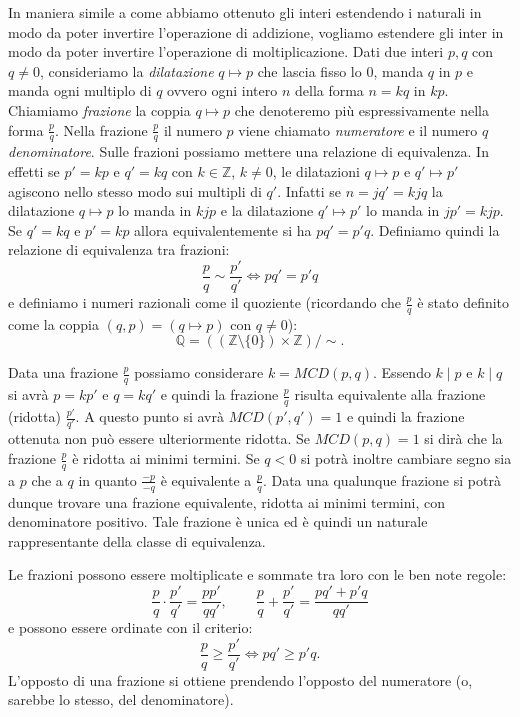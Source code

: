 \documentclass[italian,a4paper,hidelinks,headinclude]{scrartcl}
\newcommand{\ZZ}{{\mathbb Z}}
\newcommand{\QQ}{{\mathbb Q}}
\newcommand{\myemph}[1]{\emph{#1}\marginpar{#1}}
\begin{document}
In maniera simile a come abbiamo ottenuto gli interi estendendo i naturali in
modo da poter invertire l'operazione di addizione, vogliamo estendere gli
inter in modo da poter invertire l'operazione di moltiplicazione.
Dati due interi $p,q$ con $q\neq 0$,
consideriamo la \emph{dilatazione} $q\mapsto p$ che
lascia fisso lo $0$, manda $q$ in $p$ e manda ogni multiplo di $q$ ovvero
ogni intero $n$ della forma $n=kq$ in $kp$.
Chiamiamo \myemph{frazione} la coppia $q\mapsto p$ che denoteremo più espressivamente
nella forma $\frac{p}{q}$.
Nella frazione $\frac{p}{q}$ il numero $p$ viene chiamato \myemph{numeratore}
e il numero $q$ \myemph{denominatore}.
Sulle frazioni possiamo mettere una relazione di equivalenza.
In effetti se $p'=kp$ e $q'=kq$ con $k\in \ZZ$, $k\neq 0$,
le dilatazioni $q\mapsto p$ e $q'\mapsto p'$
agiscono nello stesso modo sui multipli di $q'$.
Infatti se $n=jq'=kjq$ la dilatazione $q\mapsto p$ lo manda in $kjp$ e
la dilatazione $q'\mapsto p'$ lo manda in $jp'=kjp$.
Se $q'=kq$ e $p'=kp$ allora equivalentemente si ha $pq'=p'q$.
Definiamo quindi la relazione di equivalenza tra frazioni:
\[
  \frac{p}{q} \sim \frac{p'}{q'} \iff pq' = p'q
\]
e definiamo
i numeri razionali come il quoziente
(ricordando che $\frac p q$ è stato definito come la coppia
$(q,p)=(q\mapsto p)$ con $q\neq 0$):
\[
  \QQ = ((\ZZ\setminus\{0\})\times\ZZ)/{\sim}.
\]

Data una frazione $\frac{p}{q}$ possiamo considerare $k=MCD(p,q)$.
Essendo $k\mid p$ e $k\mid q$ si avrà $p = kp'$ e $q=kq'$ e quindi la frazione
$\frac{p}{q}$ risulta equivalente alla frazione (ridotta) $\frac{p'}{q'}$.
A questo punto si avrà $MCD(p',q')=1$ e quindi la frazione ottenuta
non può essere ulteriormente ridotta. Se $MCD(p,q)=1$ si dirà che la frazione
$\frac{p}{q}$ è ridotta ai minimi termini.
Se $q<0$ si potrà inoltre cambiare segno sia a $p$ che a $q$ in quanto $\frac{-p}{-q}$
è equivalente a $\frac p q$. Data una qualunque frazione
si potrà dunque trovare una frazione equivalente, ridotta ai minimi termini,
con denominatore positivo. Tale frazione è unica ed è quindi un naturale
rappresentante della classe di equivalenza.

Le frazioni possono essere moltiplicate e sommate tra loro con le ben note
regole:
\[
  \frac{p}{q}\cdot \frac{p'}{q'} = \frac{pp'}{qq'},\qquad
  \frac{p}{q} + \frac{p'}{q'} = \frac{pq' + p'q}{qq'}
\]
e possono essere ordinate con il criterio:
\[
 \frac{p}{q} \ge \frac{p'}{q'} \iff pq' \ge p'q.
\]
L'opposto di una frazione si ottiene prendendo l'opposto del numeratore
(o, sarebbe lo stesso, del denominatore).
\end{document}

